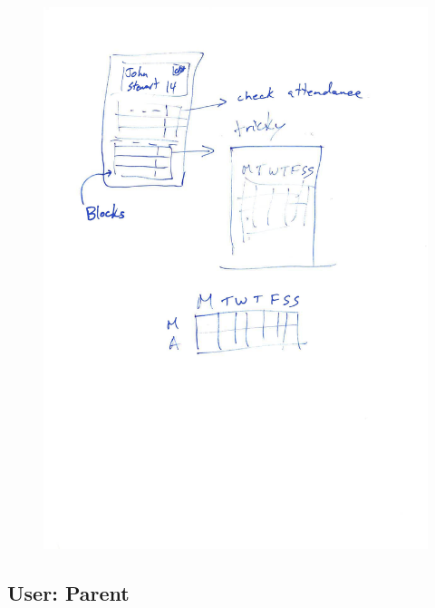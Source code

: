 \documentclass{l3proj}
\begin{document}
{
\begin{figure}[h]
\centering
\includegraphics[scale=0.50]{0085_001-page-011.jpg}
\end{figure}
}

\pagebreak
\subsection{User: Parent}
\end{document}
